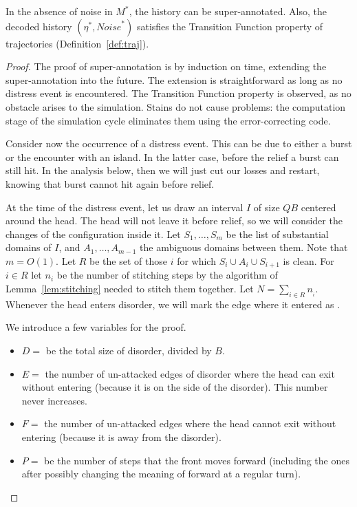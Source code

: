 \documentclass[11pt]{memoir}
\theoremstyle{definition} %
\def\B{B}
\newcommand{\Noise}{\mathit{Noise}}
\newcommand{\Q}{Q}
\begin{document}
\begin{lemma}[Healing]\label{lem:healing}
In the absence of noise in \( M^{*} \), the history can be super-annotated.
Also, the decoded history \( (\eta^{*},\Noise^{*}) \) satisfies the Transition Function property 
of trajectories (Definition~\ref{def:traj}).
\end{lemma}
\begin{proof}
The proof of super-annotation is by induction on time, extending the super-annotation into the future.
The extension is straightforward as long as no distress event is encountered.
The Transition Function property is observed, as no obstacle arises to the simulation.
Stains do not cause problems: the computation stage of the simulation cycle eliminates them
using the error-correcting code.

Consider now the occurrence of a distress event.
This can be due to either a burst or the encounter with an island.
In the latter case, before the relief a burst can still hit.
In the analysis below, then we will just cut our losses and restart, knowing that 
burst cannot hit again before relief.

At the time of the distress event, let us draw an interval \( I \) of size \( \Q\B \) centered 
around the head.
The head will not leave it before relief, so we will consider the changes of 
the configuration inside it.
Let \( S_{1},\dots,S_{m} \) be the list of substantial domains of \( I \), 
and \( A_{1},\dots,A_{m-1} \) the ambiguous domains between them.
Note that \( m=O(1) \).
Let \( R \) be the set of those \( i \) for which \( S_{i}\cup A_{i}\cup S_{i+1} \) is clean.
For \( i\in R \) let \( n_{i} \) be the number of 
stitching steps by the algorithm of Lemma~\ref{lem:stitching} needed to stitch them 
together.
Let \( N=\sum_{i\in R} n_{_{i}} \).
Whenever the head enters disorder, we will mark the edge where it entered as .

We introduce a few variables for the proof.
\begin{itemize}
\item\( D= \) be the total size of disorder, divided by \( \B \).
\item\( E= \) the number of un-attacked edges of disorder where the head can exit without
  entering (because it is on the side of the disorder).
  This number never increases.
\item \( F= \) the number of un-attacked edges where the head cannot exit without entering (because
  it is away from the disorder).
\item \( P= \) be the number of steps that the front moves forward (including the ones after possibly
changing the meaning of forward at a regular turn).
\end{itemize}


\end{proof}
\end{document}
